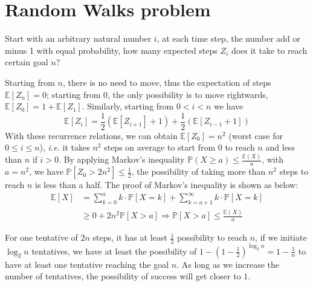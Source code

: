 \documentclass[runningheads]{llncs}
\begin{document}
\section{Random Walks problem}\label{appendix:A}
\begin{definition}
Start with an arbitrary natural number $i$, at each time step, the number add or minus 1 with equal probability, how many expected steps $Z_i$ does it take to reach certain goal $n$?
\end{definition}
Starting from $n$, there is no need to move, thus the expectation of steps $\mathbb {E}[Z_n]=0$; starting from $0$, the only possibility is to move rightwards, $\mathbb {E}[Z_0]=1+\mathbb {E}[Z_1]$. Similarly, starting from $0<i<n$ we have $$\mathbb {E}[Z_i]=\frac{1}{2} (\mathbb {E}[Z_{i+1}]+1)+\frac{1}{2} (\mathbb {E}[Z_{i-1}+1])$$
With these recurrence relations, we can obtain $\mathbb {E}[Z_0]=n^2$ (worst case for $0\leq i\leq n$), \textit{i.e.} it takes $n^2$ steps on average to start from 0 to reach $n$ and less than $n$ if $i>0$. By applying Markov's inequality $\mathbb {P} (X\geq a)\leq {\frac {\mathbb {E} (X)}{a}}$, with $a=n^2$, we have $\mathbb {P}[Z_0>2n^2]\leq \frac{1}{2}$, the possibility of taking more than $n^2$ steps to reach $n$ is less than a half. The proof of Markov's inequality is shown as below:
\begin{align*}
\mathbb {E}[X]&=\sum_{k=0}^{a}k\cdot \mathbb {P}[X=k]+\sum_{k=a+1}^{\infty}k\cdot \mathbb {P}[X=k]\\
&\geq 0+2n^2\mathbb {P}[X>a]
\Rightarrow \mathbb {P}[X>a]\leq \frac {\mathbb {E} (X)}{a}
\end{align*}

For one tentative of $2n$ steps, it has at least $\frac{1}{2}$ possibility to reach $n$, if we initiate $\log_2n$ tentatives, we have at least the possibility of $1- (1-\frac{1}{2})^{\log_2n}=1-\frac{1}{n}$ to have at least one tentative reaching the goal $n$. As long as we increase the number of tentatives, the possibility of success will get closer to $1$. 
\end{document}
